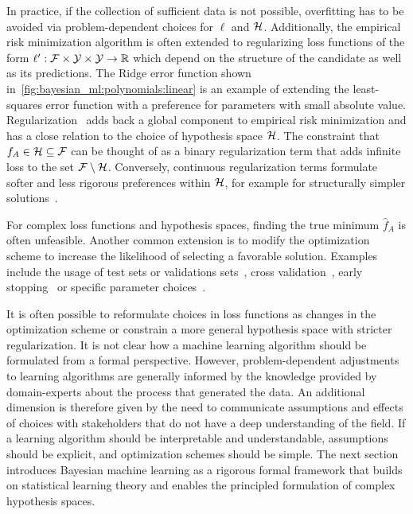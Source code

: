 In practice, if the collection of sufficient data is not possible, overfitting has to be avoided via problem-dependent choices for $\ell$ and $\mathcal{H}$.
Additionally, the empirical risk minimization algorithm is often extended to regularizing loss functions of the form $\ell^\prime : \mathcal{F} \times \mathcal{Y} \times \mathcal{Y} \to \mathbb{R}$ which depend on the structure of the candidate as well as its predictions.
The Ridge error function shown in~\cref{fig:bayesian_ml:polynomials:linear} is an example of extending the least-squares error function with a preference for parameters with small absolute value.
Regularization~\parencite{oates_modern_2019} adds back a global component to empirical risk minimization and has a close relation to the choice of hypothesis space $\mathcal{H}$.
The constraint that $f_A \in \mathcal{H} \subseteq \mathcal{F}$ can be thought of as a binary regularization term that adds infinite loss to the set $\mathcal{F} \setminus \mathcal{H}$.
Conversely, continuous regularization terms formulate softer and less rigorous preferences within $\mathcal{H}$, for example for structurally simpler solutions~\parencite{bishop_pattern_2007,thorburn_occams_1915}.

For complex loss functions and hypothesis spaces, finding the true minimum $\hat{f}_A$ is often unfeasible.
Another common extension is to modify the optimization scheme to increase the likelihood of selecting a favorable solution.
Examples include the usage of test sets or validations sets~\parencite{bishop_pattern_2007}, cross validation~\parencite{stone_cross-validatory_1974}, early stopping~\parencite{morgan_generalization_1990} or specific parameter choices~\parencite{daniely_toward_2016}.

It is often possible to reformulate choices in loss functions as changes in the optimization scheme or constrain a more general hypothesis space with stricter regularization.
It is not clear how a machine learning algorithm should be formulated from a formal perspective.
However, problem-dependent adjustments to learning algorithms are generally informed by the knowledge provided by domain-experts about the process that generated the data.
An additional dimension is therefore given by the need to communicate assumptions and effects of choices with stakeholders that do not have a deep understanding of the field.
If a learning algorithm should be interpretable and understandable, assumptions should be explicit, and optimization schemes should be simple.
The next section introduces Bayesian machine learning as a rigorous formal framework that builds on statistical learning theory and enables the principled formulation of complex hypothesis spaces.

